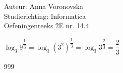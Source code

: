 \documentclass[a4paper]{article}
\begin{document}
  
\noindent \large Auteur: Anna Voronovska \\
\noindent \large Studierichting: Informatica\\
\noindent \large Oefeningenreeks 2E nr. 14.4\\

\medskip

\normalsize

$\log_3 9^{\dfrac{1}{3}} = \log_3 (3^2)^{\dfrac{1}{3}} = \log_3 3^{\dfrac{2}{3}} = \dfrac{2}{3}$

\begin{thebibliography}{999}
\end{thebibliography}
\end{document}
